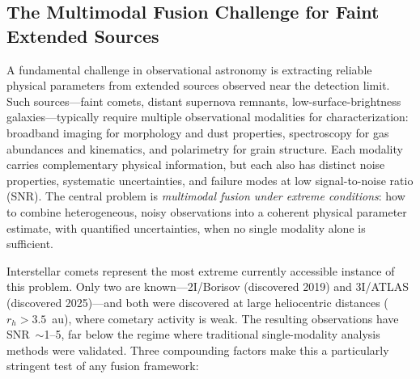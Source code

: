 \documentclass[usenatbib]{mnras}
\begin{document}
\subsection{The Multimodal Fusion Challenge for Faint Extended Sources}

A fundamental challenge in observational astronomy is extracting reliable physical parameters from extended sources observed near the detection limit. Such sources---faint comets, distant supernova remnants, low-surface-brightness galaxies---typically require multiple observational modalities for characterization: broadband imaging for morphology and dust properties, spectroscopy for gas abundances and kinematics, and polarimetry for grain structure. Each modality carries complementary physical information, but each also has distinct noise properties, systematic uncertainties, and failure modes at low signal-to-noise ratio (SNR). The central problem is \textit{multimodal fusion under extreme conditions}: how to combine heterogeneous, noisy observations into a coherent physical parameter estimate, with quantified uncertainties, when no single modality alone is sufficient.

Interstellar comets represent the most extreme currently accessible instance of this problem. Only two are known---2I/Borisov (discovered 2019) and 3I/ATLAS (discovered 2025)---and both were discovered at large heliocentric distances ($r_h > 3.5$~au), where cometary activity is weak. The resulting observations have SNR~$\sim$1--5, far below the regime where traditional single-modality analysis methods were validated. Three compounding factors make this a particularly stringent test of any fusion framework:
\end{document}
